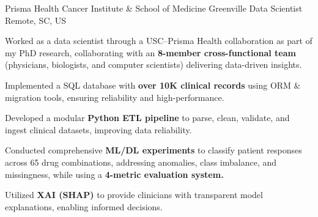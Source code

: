 
\vspace*{-0.2cm}

\begin{cventries}


\cventry
    {Prisma Health Cancer Institute \hspace{0.1cm} \& \hspace{0.1cm} School of Medicine Greenville}
    {Data Scientist}
    {}
    {Remote, SC, US}
    {
        \begin{cvitemsfree}
            \item{Worked as a data scientist through a USC--Prisma Health collaboration as part of my PhD research, collaborating with an \textbf{8-member cross-functional team} (physicians, biologists, and computer scientists) delivering data-driven insights.}
            \item{Implemented a SQL database with \textbf{over 10K clinical records} using ORM \& migration tools, ensuring reliability and high-performance.} %
            \item{Developed a modular \textbf{Python ETL pipeline} to parse, clean, validate, and ingest clinical datasets, improving data reliability.}
            \item{Conducted comprehensive \textbf{ML/DL experiments} to classify patient responses across 65 drug combinations, addressing anomalies, class imbalance, and missingness, while using a \textbf{4-metric evaluation system.}}
            \item{Utilized \textbf{XAI (SHAP)} to provide clinicians with transparent model explanations, enabling informed decisions.}
        \end{cvitemsfree}
    }

\vspace*{0.2cm}


\end{cventries}
